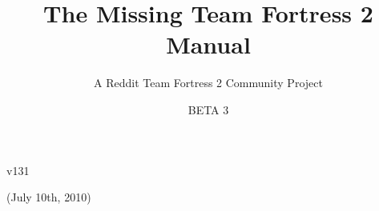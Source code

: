 \documentclass[letterpaper,12pt]{article}
\title{The Missing Team Fortress 2 Manual}
\author{A Reddit Team Fortress 2 Community Project}
\date{BETA 3}
\begin{document}
\maketitle

\vspace{140 mm}
\begin{center}v131 \end{center}

\begin{center}(July 10th, 2010) \end{center}



\thispagestyle{empty}
\newpage
\pagestyle{headings}
\setcounter{page}{1}

\tableofcontents


\newpage
\setcounter{page}{1}



\newpage



\newpage


\newpage


\newpage


\newpage


\newpage


\newpage

\end{document}
